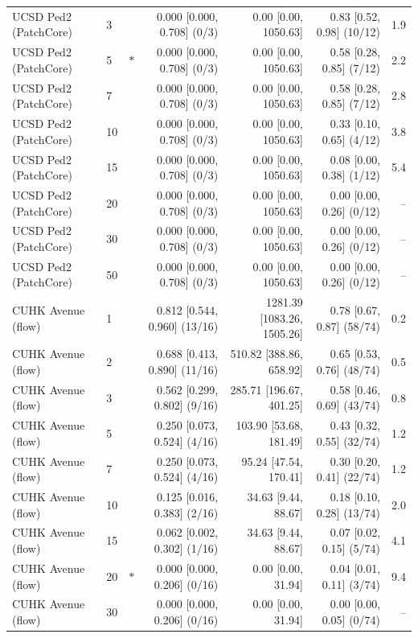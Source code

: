 \begin{table}[t]
{\begin{tabular}{llcrrrr}
UCSD Ped2 (PatchCore) & 3 &  & 0.000 [0.000, 0.708] (0/3) & 0.00 [0.00, 1050.63] & 0.83 [0.52, 0.98] (10/12) & 1.9 \\
UCSD Ped2 (PatchCore) & 5 & $\ast$ & 0.000 [0.000, 0.708] (0/3) & 0.00 [0.00, 1050.63] & 0.58 [0.28, 0.85] (7/12) & 2.2 \\
UCSD Ped2 (PatchCore) & 7 &  & 0.000 [0.000, 0.708] (0/3) & 0.00 [0.00, 1050.63] & 0.58 [0.28, 0.85] (7/12) & 2.8 \\
UCSD Ped2 (PatchCore) & 10 &  & 0.000 [0.000, 0.708] (0/3) & 0.00 [0.00, 1050.63] & 0.33 [0.10, 0.65] (4/12) & 3.8 \\
UCSD Ped2 (PatchCore) & 15 &  & 0.000 [0.000, 0.708] (0/3) & 0.00 [0.00, 1050.63] & 0.08 [0.00, 0.38] (1/12) & 5.4 \\
UCSD Ped2 (PatchCore) & 20 &  & 0.000 [0.000, 0.708] (0/3) & 0.00 [0.00, 1050.63] & 0.00 [0.00, 0.26] (0/12) & -- \\
UCSD Ped2 (PatchCore) & 30 &  & 0.000 [0.000, 0.708] (0/3) & 0.00 [0.00, 1050.63] & 0.00 [0.00, 0.26] (0/12) & -- \\
UCSD Ped2 (PatchCore) & 50 &  & 0.000 [0.000, 0.708] (0/3) & 0.00 [0.00, 1050.63] & 0.00 [0.00, 0.26] (0/12) & -- \\
CUHK Avenue (flow) & 1 &  & 0.812 [0.544, 0.960] (13/16) & 1281.39 [1083.26, 1505.26] & 0.78 [0.67, 0.87] (58/74) & 0.2 \\
CUHK Avenue (flow) & 2 &  & 0.688 [0.413, 0.890] (11/16) & 510.82 [388.86, 658.92] & 0.65 [0.53, 0.76] (48/74) & 0.5 \\
CUHK Avenue (flow) & 3 &  & 0.562 [0.299, 0.802] (9/16) & 285.71 [196.67, 401.25] & 0.58 [0.46, 0.69] (43/74) & 0.8 \\
CUHK Avenue (flow) & 5 &  & 0.250 [0.073, 0.524] (4/16) & 103.90 [53.68, 181.49] & 0.43 [0.32, 0.55] (32/74) & 1.2 \\
CUHK Avenue (flow) & 7 &  & 0.250 [0.073, 0.524] (4/16) & 95.24 [47.54, 170.41] & 0.30 [0.20, 0.41] (22/74) & 1.2 \\
CUHK Avenue (flow) & 10 &  & 0.125 [0.016, 0.383] (2/16) & 34.63 [9.44, 88.67] & 0.18 [0.10, 0.28] (13/74) & 2.0 \\
CUHK Avenue (flow) & 15 &  & 0.062 [0.002, 0.302] (1/16) & 34.63 [9.44, 88.67] & 0.07 [0.02, 0.15] (5/74) & 4.1 \\
CUHK Avenue (flow) & 20 & $\ast$ & 0.000 [0.000, 0.206] (0/16) & 0.00 [0.00, 31.94] & 0.04 [0.01, 0.11] (3/74) & 9.4 \\
CUHK Avenue (flow) & 30 &  & 0.000 [0.000, 0.206] (0/16) & 0.00 [0.00, 31.94] & 0.00 [0.00, 0.05] (0/74) & -- \\

\end{tabular}}
\end{table}
